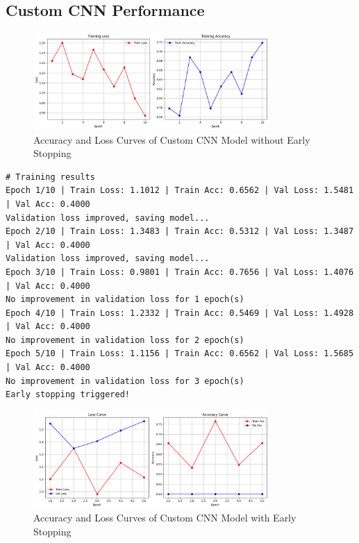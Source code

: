 \documentclass[a4paper,12pt]{article}
\begin{document}
\subsection*{Custom CNN Performance}
\begin{figure}[H]
    \centering
    \includegraphics[width=0.8\textwidth]{assets/cassava/custom_acc_loss.png}
    \caption{Accuracy and Loss Curves of Custom CNN Model without Early Stopping}
\end{figure}

\begin{verbatim}
# Training results
Epoch 1/10 | Train Loss: 1.1012 | Train Acc: 0.6562 | Val Loss: 1.5481 | Val Acc: 0.4000
Validation loss improved, saving model...
Epoch 2/10 | Train Loss: 1.3483 | Train Acc: 0.5312 | Val Loss: 1.3487 | Val Acc: 0.4000
Validation loss improved, saving model...
Epoch 3/10 | Train Loss: 0.9801 | Train Acc: 0.7656 | Val Loss: 1.4076 | Val Acc: 0.4000
No improvement in validation loss for 1 epoch(s)
Epoch 4/10 | Train Loss: 1.2332 | Train Acc: 0.5469 | Val Loss: 1.4928 | Val Acc: 0.4000
No improvement in validation loss for 2 epoch(s)
Epoch 5/10 | Train Loss: 1.1156 | Train Acc: 0.6562 | Val Loss: 1.5685 | Val Acc: 0.4000
No improvement in validation loss for 3 epoch(s)
Early stopping triggered!
\end{verbatim}

\begin{figure}[H]
    \centering
    \includegraphics[width=0.8\textwidth]{assets/cassava/early_custom_loss_accu.png}
    \caption{Accuracy and Loss Curves of Custom CNN Model with Early Stopping}
\end{figure}
\end{document}
